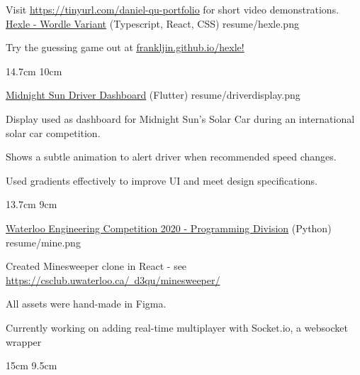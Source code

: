 

\begin{cventries}

  Visit \href{https://tinyurl.com/daniel-qu-portfolio}{\underline{https://tinyurl.com/daniel-qu-portfolio}} for short video demonstrations.
  \\%
  \portfolioEntry
    {\href{https://frankljin.github.io/hexle/}{Hexle - Wordle Variant} (Typescript, React, CSS)} %
    {resume/hexle.png} %
    {
      \begin{cvitems} %
        \item {Try the guessing game out at \href{https://frankljin.github.io/hexle/}{\underline{frankljin.github.io/hexle}!}}
      \end{cvitems}
    }
    {14.7cm}
    {10cm}

  \portfolioEntry
    {\href{https://github.com/uw-midsun/telemetry_xiv}{Midnight Sun Driver Dashboard} (Flutter)} %
    {resume/driverdisplay.png} %
    {
      \begin{cvitems} %
        \item {Display used as dashboard for Midnight Sun's Solar Car during an international solar car competition.}
        \item {Shows a subtle animation to alert driver when recommended speed changes.}
        \item {Used gradients effectively to improve UI and meet design specifications.}
      \end{cvitems}
    }
    {13.7cm}
    {9cm}

  \newpage

  \portfolioEntry
    {\href{https://github.com/danielq987/WECF2020}{Waterloo Engineering Competition 2020 - Programming Division} (Python)} %
    {resume/mine.png} %
    {
      \begin{cvitems} %
        \item {Created Minesweeper clone in React - see \href{https://csclub.uwaterloo.ca/~d3qu/minesweeper/}{https://csclub.uwaterloo.ca/~d3qu/minesweeper/}}
        \item {All assets were hand-made in Figma.}
        \item {Currently working on adding real-time multiplayer with Socket.io, a websocket wrapper}
      \end{cvitems}
    }
    {15cm}
    {9.5cm}


\end{cventries}
